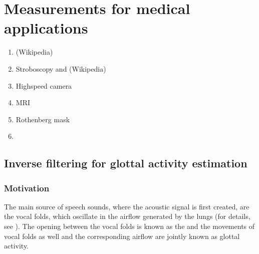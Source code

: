\documentclass[letterpaper,10pt,english]{jupyterBook}
\begin{document}
\section{Measurements for medical applications}
\label{\detokenize{Analysis/Measurements_for_medical_applications:measurements-for-medical-applications}}\label{\detokenize{Analysis/Measurements_for_medical_applications::doc}}\begin{enumerate}
%
\item {} 
\sphinxAtStartPar
{}
(Wikipedia)

\item {} 
\sphinxAtStartPar
Stroboscopy and
(Wikipedia)

\item {} 
\sphinxAtStartPar
Highspeed camera

\item {} 
\sphinxAtStartPar
MRI

\item {} 
\sphinxAtStartPar
Rothenberg mask

\item {} 
\sphinxAtStartPar
{\hyperref[\detokenize{Analysis/Inverse_filtering_for_glottal_activity_estimation::doc}]{}}

\end{enumerate}

\sphinxstepscope


\subsection{Inverse filtering for glottal activity estimation}
\label{\detokenize{Analysis/Inverse_filtering_for_glottal_activity_estimation:inverse-filtering-for-glottal-activity-estimation}}\label{\detokenize{Analysis/Inverse_filtering_for_glottal_activity_estimation::doc}}

\subsubsection{Motivation}
\label{\detokenize{Analysis/Inverse_filtering_for_glottal_activity_estimation:motivation}}
\sphinxAtStartPar
The main source of speech sounds, where the acoustic signal is first
created, are the vocal folds, which oscillate in the airflow generated
by the lungs (for details, see ). The opening
between the vocal folds is known as the  and the movements of
vocal folds as well and the corresponding airflow are jointly known as
glottal activity.
\end{document}
